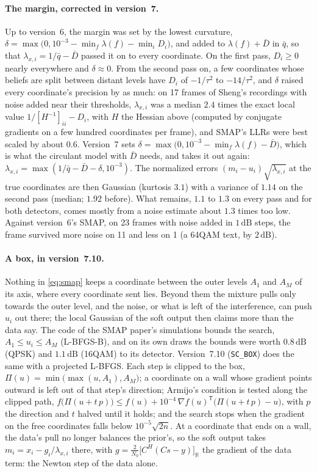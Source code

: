 \documentclass[11pt,a4paper]{article}
\newcommand{\dB}{\,\mathrm{dB}}
\newcommand{\code}[1]{\texttt{#1}}
\theoremstyle{remark}
\begin{document}
\paragraph{The margin, corrected in version~7.}
Up to version~6, the margin was set by the lowest curvature, $\delta = \max\bigl(0, 10^{-3} - \min_f \lambda(f) - \min_i D_i\bigr)$, and added to $\lambda(f) + \bar D$ in $\bar q$, so that $\lambda_{x,i} = 1/\bar q - \bar D$ passed it on to every coordinate. On the first pass, $D_i \ge 0$ nearly everywhere and $\delta \approx 0$. From the second pass on, a few coordinates whose beliefs are split between distant levels have $D_i$ of $-1/\tau^2$ to $-14/\tau^2$, and $\delta$ raised every coordinate's precision by as much: on 17 frames of Sheng's recordings with noise added near their thresholds, $\lambda_{x,i}$ was a median $2.4$ times the exact local value $1/[H^{-1}]_{ii} - D_i$, with $H$ the Hessian above (computed by conjugate gradients on a few hundred coordinates per frame), and SMAP's LLRs were best scaled by about $0.6$. Version~7 sets $\delta = \max\bigl(0, 10^{-3} - \min_f \lambda(f) - \bar D\bigr)$, which is what the circulant model with $\bar D$ needs, and takes it out again: $\lambda_{x,i} = \max(1/\bar q - \bar D - \delta, 10^{-3})$. The normalized errors $(m_i - u_i)\sqrt{\lambda_{x,i}}$ at the true coordinates are then Gaussian (kurtosis $3.1$) with a variance of $1.14$ on the second pass (median; $1.92$ before). What remains, $1.1$ to $1.3$ on every pass and for both detectors, comes mostly from a noise estimate about $1.3$ times too low. Against version~6's SMAP, on 23 frames with noise added in $1\dB$ steps, the frame survived more noise on 11 and less on 1 (a 64QAM text, by $2\dB$).

\paragraph{A box, in version~7.10.}
Nothing in \cref{eq:smap} keeps a coordinate between the outer levels $A_1$ and $A_M$ of its axis, where every coordinate sent lies. Beyond them the mixture pulls only towards the outer level, and the noise, or what is left of the interference, can push $u_i$ out there; the local Gaussian of the soft output then claims more than the data say. The code of the SMAP paper's simulations bounds the search, $A_1 \le u_i \le A_M$ (L-BFGS-B), and on its own draws the bounds were worth $0.8\dB$ (QPSK) and $1.1\dB$ (16QAM) to its detector. Version~7.10 (\code{SC\_BOX}) does the same with a projected L-BFGS. Each step is clipped to the box, $\Pi(u) = \min\bigl(\max(u, A_1), A_M\bigr)$; a coordinate on a wall whose gradient points outward is left out of that step's direction; Armijo's condition is tested along the clipped path, $f\bigl(\Pi(u + t\,p)\bigr) \le f(u) + 10^{-4}\,\nabla f(u)^{\mathsf T}\bigl(\Pi(u + t\,p) - u\bigr)$, with $p$ the direction and $t$ halved until it holds; and the search stops when the gradient on the free coordinates falls below $10^{-5}\sqrt{2n}$. At a coordinate that ends on a wall, the data's pull no longer balances the prior's, so the soft output takes $m_i = x_i - g_i/\lambda_{x,i}$ there, with $g = \tfrac{2}{N_0}\bigl[C^H (C s - y)\bigr]_{\mathbb R}$ the gradient of the data term: the Newton step of the data alone.
\end{document}
